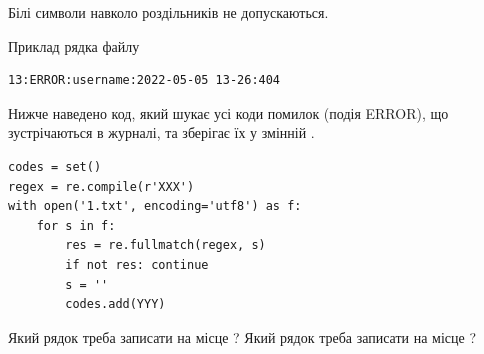 \documentclass[12pt, ukrainian]{article}
\begin{document}
{Білі символи навколо роздільників не допускаються.

Приклад рядка файлу



\begin{verbatim}
13:ERROR:username:2022-05-05 13-26:404
\end{verbatim}


Нижче наведено код, який шукає усі коди помилок (подія ERROR), що зустріча\-ють\-ся в журналі, та зберігає їх у змінній .



\begin{verbatim}
codes = set()
regex = re.compile(r'XXX')
with open('1.txt', encoding='utf8') as f:
    for s in f:
        res = re.fullmatch(regex, s)
        if not res: continue
        s = ''
        codes.add(YYY)
\end{verbatim}



Який рядок треба записати на місце  ?
Який рядок треба записати на місце  ?\par

}
\newpage
\end{document}
